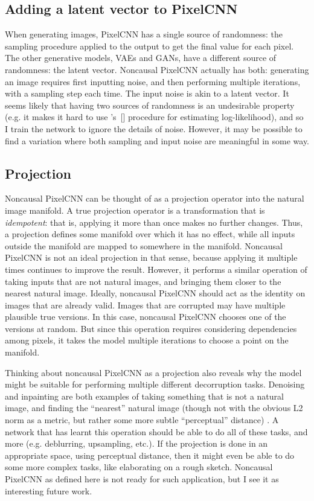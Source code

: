 \documentclass[11pt, a4paper, openany]{book}
\newcommand{\nquote}[1]{``{#1}''}
\newcommand\cites[1]{\citeauthor{#1}'s\ [\citeyear{#1}]}
\begin{document}
\subsection{Adding a latent vector to PixelCNN}

When generating images, PixelCNN has a single source of randomness: the sampling procedure applied to the output to get the final value for each pixel. The other generative models, VAEs and GANs, have a different source of randomness: the latent vector. Noncausal PixelCNN actually has both: generating an image requires first inputting noise, and then performing multiple iterations, with a sampling step each time. The input noise is akin to a latent vector. It seems likely that having two sources of randomness is an undesirable property (e.g. it makes it hard to use \cites{likelihoodestimation} procedure for estimating log-likelihood), and so I train the network to ignore the details of noise. However, it may be possible to find a variation where both sampling and input noise are meaningful in some way.

\subsection{Projection}

Noncausal PixelCNN can be thought of as a projection operator into the natural image manifold. A true projection operator is a transformation that is \emph{idempotent}: that is, applying it more than once makes no further changes. Thus, a projection defines some manifold over which it has no effect, while all inputs outside the manifold are mapped to somewhere in the manifold. Noncausal PixelCNN is not an ideal projection in that sense, because applying it multiple times continues to improve the result. However, it performs a similar operation of taking inputs that are not natural images, and bringing them closer to the nearest natural image. Ideally, noncausal PixelCNN should act as the identity on images that are already valid. Images that are corrupted may have multiple plausible true versions. In this case, noncausal PixelCNN chooses one of the versions at random. But since this operation requires considering dependencies among pixels, it takes the model multiple iterations to choose a point on the manifold.

Thinking about noncausal PixelCNN as a projection also reveals why the model might be suitable for performing multiple different decorruption tasks. Denoising and inpainting are both examples of taking something that is not a natural image, and finding the \nquote{nearest} natural image (though not with the obvious L2 norm as a metric, but rather some more subtle \nquote{perceptual} distance) \citep{imageinpainting}. A network that has learnt this operation should be able to do all of these tasks, and more (e.g. deblurring, upsampling, etc.). If the projection is done in an appropriate space, using perceptual distance, then it might even be able to do some more complex tasks, like elaborating on a rough sketch. Noncausal PixelCNN as defined here is not ready for such application, but I see it as interesting future work.
\end{document}
